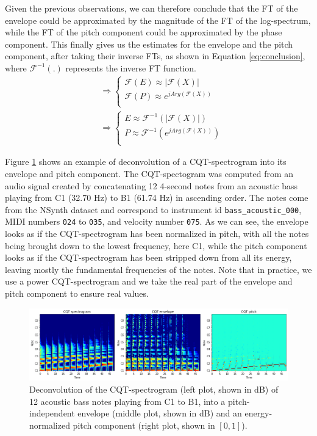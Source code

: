 \documentclass[journal]{IEEEtran}
\begin{document}
Given the previous observations, we can therefore conclude that the FT of the envelope could be approximated by the magnitude of the FT of the log-spectrum, while the FT of the pitch component could be approximated by the phase component. This finally gives us the estimates for the envelope and the pitch component, after taking their inverse FTs, as shown in Equation \ref{eq:conclusion}, where $\mathcal{F}^{-1}(.)$ represents the inverse FT function.
\begin{equation}
\label{eq:conclusion}
\begin{split}
& \Rightarrow 
\begin{cases}
\mathcal{F}(E) \approx |\mathcal{F}(X)| \\
\mathcal{F}(P) \approx e^{j Arg(\mathcal{F}(X))} \\
\end{cases} \\
& \Rightarrow
\begin{cases}
E \approx \mathcal{F}^{-1}(|\mathcal{F}(X)|) \\
P \approx \mathcal{F}^{-1}(e^{j Arg(\mathcal{F}(X))}) \\
\end{cases}
\end{split}
\end{equation}

Figure \ref{fig:deconvolution} shows an example of deconvolution of a CQT-spectrogram into its envelope and pitch component. The CQT-spectogram was computed from an audio signal created by concatenating 12 4-second notes from an acoustic bass playing from C1 (32.70 Hz) to B1 (61.74 Hz) in ascending order. The notes come from the NSynth dataset \cite{engel2017} and correspond to instrument id \texttt{bass\_acoustic\_000}, MIDI numbers \texttt{024} to \texttt{035}, and velocity number \texttt{075}. As we can see, the envelope looks as if the CQT-spectrogram has been normalized in pitch, with all the notes being brought down to the lowest frequency, here C1, while the pitch component looks as if the CQT-spectrogram has been stripped down from all its energy, leaving mostly the fundamental frequencies of the notes. Note that in practice, we use a power CQT-spectrogram and we take the real part of the envelope and pitch component to ensure real values. 

\begin{figure}[htp]
    \centering
    \includegraphics[width=\textwidth]{deconvolution.png}
    \caption{Deconvolution of the CQT-spectrogram (left plot, shown in dB) of 12 acoustic bass notes playing from C1 to B1, into a pitch-independent envelope (middle plot, shown in dB) and an energy-normalized pitch component (right plot, shown in $[0, 1]$).}
    \label{fig:deconvolution}
\end{figure}
\end{document}
